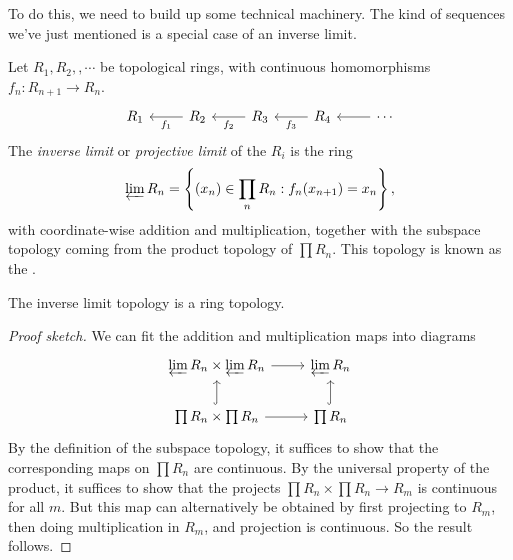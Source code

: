 \documentclass[a4paper]{article}
\begin{document}
To do this, we need to build up some technical machinery. The kind of sequences we've just mentioned is a special case of an inverse limit.
\begin{defi}
  Let $R_1, R_2,, \cdots$ be topological rings, with continuous homomorphisms $f_n: R_{n + 1} \to R_n$.
  \[
    \begin{tikzcd}
      R_1 & R_2 \ar[l, "f_1"] & R_3 \ar[l, "f_2"] & R_4 \ar[l, "f_3"] & \ar[l] \cdots
    \end{tikzcd}
  \]
  The \emph{inverse limit} or \emph{projective limit} of the $R_i$ is the ring
  \[
    \varprojlim R_n = \left\{(x_n) \in \prod_n R_n : f_n(x_{n + 1}) = x_n\right\},
  \]
  with coordinate-wise addition and multiplication, together with the subspace topology coming from the product topology of $\prod R_n$. This topology is known as the .
\end{defi}

\begin{prop}
  The inverse limit topology is a ring topology.
\end{prop}

\begin{proof}[Proof sketch]
  We can fit the addition and multiplication maps into diagrams
  \[
    \begin{tikzcd}
      \varprojlim R_n \times \varprojlim R_n \ar[r] & \varprojlim R_n\\
      \prod R_n \times \prod R_n \ar[u, hook] \ar[r] & \prod R_n \ar[u, hook]
    \end{tikzcd}
  \]
  By the definition of the subspace topology, it suffices to show that the corresponding maps on $\prod R_n$ are continuous. By the universal property of the product, it suffices to show that the projects $\prod R_n \times \prod R_n \to R_m$ is continuous for all $m$. But this map can alternatively be obtained by first projecting to $R_m$, then doing multiplication in $R_m$, and projection is continuous. So the result follows.
\end{proof}
\end{document}
